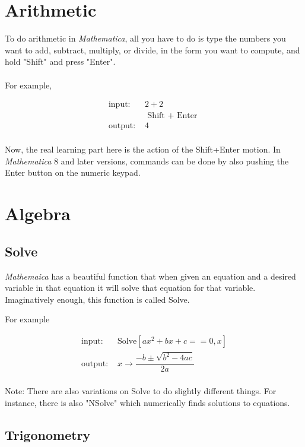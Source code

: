 \documentclass[11pt,a4paper,twoside]{article}
\begin{document}
		\section{Arithmetic}
			
			To do arithmetic in \textit{Mathematica}, all you have to do is type the numbers you want to add, subtract, multiply, or divide, in the form you want to compute, and hold "Shift" and press "Enter".
			\\
			\\
			For example, 
			
			\begin{align*}
				\text{input: }& 2 + 2 \\
				& \text{ Shift + Enter } \\
				\text{output: }& 4 \\
			\end{align*}
			
			Now, the real learning part here is the action of the Shift+Enter motion.  In \textit{Mathematica} 8 and later versions, commands can be done by also pushing the Enter button on the numeric keypad.
		
		\section{Algebra}
				
			\subsection{Solve}				
						
				\textit{Mathemaica} has a beautiful function that when given an equation and a desired variable in that equation it will solve that equation for that variable.  Imaginatively enough, this function is called Solve.
						
				For example
					
				\begin{align*}
					\text{input: }& \text{Solve}[ ax^2 + bx + c == 0, x ] \\
					\text{output: }& x \rightarrow \dfrac{ -b \pm \sqrt{b^2 - 4ac } }{ 2a } \\
				\end{align*}
						
				Note: There are also variations on Solve to do slightly different things.  For instance, there is also "NSolve" which numerically finds solutions to equations.
						
			\subsection{Trigonometry}
					
\end{document}
